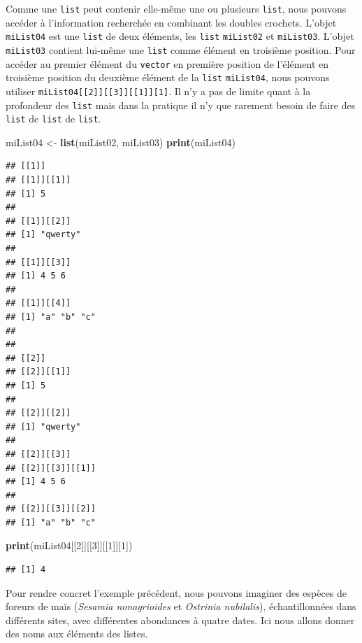 \documentclass[twoside,symmetric]{book}
\newenvironment{Shaded}{}{}
\newcommand{\DecValTok}[1]{#1}
\newcommand{\KeywordTok}[1]{\textbf{#1}}
\newcommand{\NormalTok}[1]{#1}
\newcommand{\StringTok}[1]{#1}
\begin{document}
Comme une \texttt{list} peut contenir elle-même une ou plusieurs \texttt{list}, nous pouvons accéder à l'information recherchée en combinant les doubles crochets. L'objet \texttt{miList04} est une \texttt{list} de deux éléments, les \texttt{list} \texttt{miList02} et \texttt{miList03}. L'objet \texttt{miList03} contient lui-même une \texttt{list} comme élément en troisième position. Pour accéder au premier élément du \texttt{vector} en première position de l'élément en troisième position du deuxième élément de la \texttt{list} \texttt{miList04}, nous pouvons utiliser \texttt{miList04{[}{[}2{]}{]}{[}{[}3{]}{]}{[}{[}1{]}{]}{[}1{]}}. Il n'y a pas de limite quant à la profondeur des \texttt{list} mais dans la pratique il n'y que rarement besoin de faire des \texttt{list} de \texttt{list} de \texttt{list}.

\begin{Shaded}
\begin{Highlighting}[]
\NormalTok{miList04 <-}\StringTok{ }\KeywordTok{list}\NormalTok{(miList02, miList03)}
\KeywordTok{print}\NormalTok{(miList04)}
\end{Highlighting}
\end{Shaded}

\begin{verbatim}
## [[1]]
## [[1]][[1]]
## [1] 5
## 
## [[1]][[2]]
## [1] "qwerty"
## 
## [[1]][[3]]
## [1] 4 5 6
## 
## [[1]][[4]]
## [1] "a" "b" "c"
## 
## 
## [[2]]
## [[2]][[1]]
## [1] 5
## 
## [[2]][[2]]
## [1] "qwerty"
## 
## [[2]][[3]]
## [[2]][[3]][[1]]
## [1] 4 5 6
## 
## [[2]][[3]][[2]]
## [1] "a" "b" "c"
\end{verbatim}

\begin{Shaded}
\begin{Highlighting}[]
\KeywordTok{print}\NormalTok{(miList04[[}\DecValTok{2}\NormalTok{]][[}\DecValTok{3}\NormalTok{]][[}\DecValTok{1}\NormalTok{]][}\DecValTok{1}\NormalTok{])}
\end{Highlighting}
\end{Shaded}

\begin{verbatim}
## [1] 4
\end{verbatim}

Pour rendre concret l'exemple précédent, nous pouvons imaginer des espèces de foreurs de maïs (\emph{Sesamia nonagrioides} et \emph{Ostrinia nubilalis}), échantillonnées dans différents sites, avec différentes abondances à quatre dates. Ici nous allons donner des noms aux éléments des listes.
\end{document}
